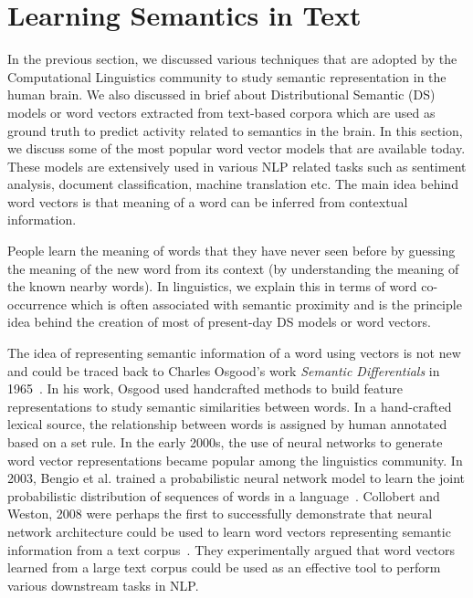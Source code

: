 \section{Learning Semantics in Text}

In the previous section, we discussed various techniques that are adopted by the Computational Linguistics community to study semantic representation in the human brain. We also discussed in brief about Distributional Semantic (DS) models or word vectors extracted from text-based corpora which are used as ground truth to predict activity related to semantics in the brain. In this section, we discuss some of the most popular word vector models that are available today. These models are extensively used in various NLP related tasks such as sentiment analysis, document classification, machine translation etc. The main idea behind word vectors is that
meaning of a word can be inferred from contextual information.

People learn the meaning of words that they have never seen before by guessing the meaning of
the new word from its context (by understanding the meaning
of the known nearby words). In linguistics, we explain this
in terms of word co-occurrence which is often associated with
semantic proximity and is the principle idea behind the creation of most of present-day DS models or word vectors.

The idea of representing semantic information of a word using
vectors is not new and could be traced back to Charles
Osgood’s work \textit{Semantic Differentials} in 1965~\cite{osgood1965cross}. In his work,
Osgood used handcrafted methods to build feature
representations to study semantic similarities between words. In a hand-crafted lexical source, the relationship between words is assigned by human annotated based on a set rule. In the early 2000s, the use of neural networks to generate word vector representations became popular among the linguistics community. In
2003, Bengio et al. trained a probabilistic neural network model to learn the joint probabilistic distribution of
sequences of words in a language~\cite{bengio2003neural}. Collobert and Weston, 2008 were perhaps the first to successfully demonstrate that neural network
architecture could be used to learn word vectors
representing semantic information from a text corpus~\cite{collobert2008unified}. They
experimentally argued that word vectors learned from a large text corpus could be used as an effective tool to perform various downstream tasks
in NLP. 

